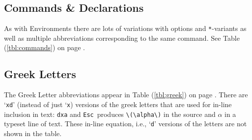 \documentclass[11pt]{article}
\newcommand{\esckey}{\texttt{Esc}}
\begin{document}
\subsection*{Commands \& Declarations}

As with Environments there are lots of variations with options and \texttt{*}-variants as well as multiple abbreviations corresponding to the same command. See Table (\ref{tbl:commands}) on page \pageref{tbl:commands}.

\subsection*{Greek Letters}

The Greek Letter abbreviations appear in Table (\ref{tbl:greek}) on page \pageref{tbl:greek}. There are `\texttt{xd}' (instead of just `\texttt{x}) versions of the greek letters that are used for in-line inclusion in text: \texttt{dxa} and \esckey\ produces \verb'\(\alpha\)' in the source and \(\alpha\) in a typeset line of text. These in-line equation, i.e., `\texttt{d}' versions of the letters are not shown in the table.
\end{document}
